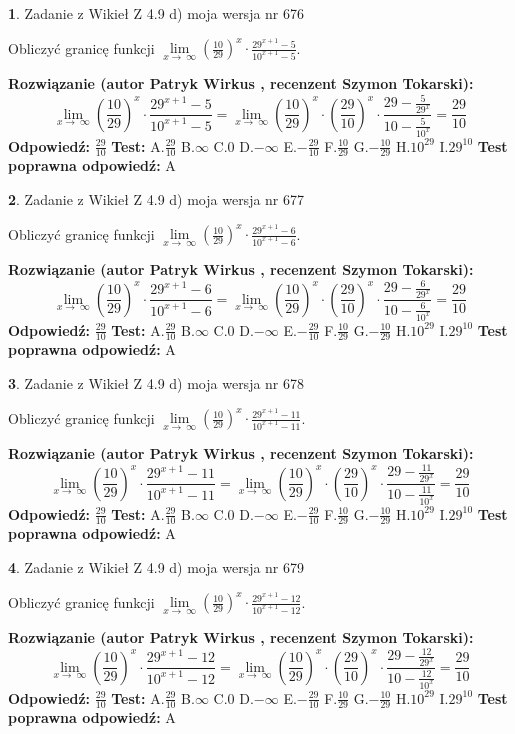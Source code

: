 \documentclass[12pt, a4paper]{article}
\theoremstyle{definition} %
\newtheorem{zad}{}
\newcommand{\zadStart}[1]{\begin{zad}#1\newline}
\newcommand{\zadStop}{\end{zad}}
\newcommand{\rozwStart}[2]{\noindent \textbf{Rozwiązanie (autor #1 , recenzent #2): }\newline}
\newcommand{\rozwStop}{\newline}
\newcommand{\odpStart}{\noindent \textbf{Odpowiedź:}\newline}
\newcommand{\odpStop}{\newline}
\newcommand{\testStart}{\noindent \textbf{Test:}\newline}
\newcommand{\testStop}{\newline}
\newcommand{\kluczStart}{\noindent \textbf{Test poprawna odpowiedź:}\newline}
\newcommand{\kluczStop}{\newline}
\begin{document}
\zadStart{Zadanie z Wikieł Z 4.9 d) moja wersja nr 676}


Obliczyć granicę funkcji  $\lim\limits_{x\to\ \infty}(\frac{10}{29})^{x}\cdot\frac{29^{x+1}-5}{10^{x+1}-5}$.
\zadStop
\rozwStart{Patryk Wirkus}{Szymon Tokarski}
$$\lim\limits_{x\to\ \infty}(\frac{10}{29})^{x}\cdot\frac{29^{x+1}-5}{10^{x+1}-5}=\lim\limits_{x\to\ \infty}(\frac{10}{29})^{x}\cdot(\frac{29}{10})^{x} \cdot \frac{29-\frac{5}{29^{x}}}{10-\frac{5}{10^{x}}} = \frac{29}{10}$$
\rozwStop
\odpStart
$\frac{29}{10}$
\odpStop
\testStart
A.$\frac{29}{10}$ B.$\infty$ C.$0$ D.$-\infty$ E.$-\frac{29}{10}$
F.$\frac{10}{29}$ G.$-\frac{10}{29}$
H.$10^{29}$
I.$29^{10}$
\testStop
\kluczStart
A
\kluczStop



\zadStart{Zadanie z Wikieł Z 4.9 d) moja wersja nr 677}


Obliczyć granicę funkcji  $\lim\limits_{x\to\ \infty}(\frac{10}{29})^{x}\cdot\frac{29^{x+1}-6}{10^{x+1}-6}$.
\zadStop
\rozwStart{Patryk Wirkus}{Szymon Tokarski}
$$\lim\limits_{x\to\ \infty}(\frac{10}{29})^{x}\cdot\frac{29^{x+1}-6}{10^{x+1}-6}=\lim\limits_{x\to\ \infty}(\frac{10}{29})^{x}\cdot(\frac{29}{10})^{x} \cdot \frac{29-\frac{6}{29^{x}}}{10-\frac{6}{10^{x}}} = \frac{29}{10}$$
\rozwStop
\odpStart
$\frac{29}{10}$
\odpStop
\testStart
A.$\frac{29}{10}$ B.$\infty$ C.$0$ D.$-\infty$ E.$-\frac{29}{10}$
F.$\frac{10}{29}$ G.$-\frac{10}{29}$
H.$10^{29}$
I.$29^{10}$
\testStop
\kluczStart
A
\kluczStop



\zadStart{Zadanie z Wikieł Z 4.9 d) moja wersja nr 678}


Obliczyć granicę funkcji  $\lim\limits_{x\to\ \infty}(\frac{10}{29})^{x}\cdot\frac{29^{x+1}-11}{10^{x+1}-11}$.
\zadStop
\rozwStart{Patryk Wirkus}{Szymon Tokarski}
$$\lim\limits_{x\to\ \infty}(\frac{10}{29})^{x}\cdot\frac{29^{x+1}-11}{10^{x+1}-11}=\lim\limits_{x\to\ \infty}(\frac{10}{29})^{x}\cdot(\frac{29}{10})^{x} \cdot \frac{29-\frac{11}{29^{x}}}{10-\frac{11}{10^{x}}} = \frac{29}{10}$$
\rozwStop
\odpStart
$\frac{29}{10}$
\odpStop
\testStart
A.$\frac{29}{10}$ B.$\infty$ C.$0$ D.$-\infty$ E.$-\frac{29}{10}$
F.$\frac{10}{29}$ G.$-\frac{10}{29}$
H.$10^{29}$
I.$29^{10}$
\testStop
\kluczStart
A
\kluczStop



\zadStart{Zadanie z Wikieł Z 4.9 d) moja wersja nr 679}


Obliczyć granicę funkcji  $\lim\limits_{x\to\ \infty}(\frac{10}{29})^{x}\cdot\frac{29^{x+1}-12}{10^{x+1}-12}$.
\zadStop
\rozwStart{Patryk Wirkus}{Szymon Tokarski}
$$\lim\limits_{x\to\ \infty}(\frac{10}{29})^{x}\cdot\frac{29^{x+1}-12}{10^{x+1}-12}=\lim\limits_{x\to\ \infty}(\frac{10}{29})^{x}\cdot(\frac{29}{10})^{x} \cdot \frac{29-\frac{12}{29^{x}}}{10-\frac{12}{10^{x}}} = \frac{29}{10}$$
\rozwStop
\odpStart
$\frac{29}{10}$
\odpStop
\testStart
A.$\frac{29}{10}$ B.$\infty$ C.$0$ D.$-\infty$ E.$-\frac{29}{10}$
F.$\frac{10}{29}$ G.$-\frac{10}{29}$
H.$10^{29}$
I.$29^{10}$
\testStop
\kluczStart
A
\kluczStop
\end{document}
